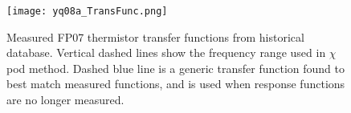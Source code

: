 \documentclass{ametsoc}
\begin{document}
\begin{figure}[t]
  \noindent\texttt{[image: yq08a\_TransFunc.png]}\\
  \caption{Measured FP07 thermistor transfer functions from historical database. Vertical dashed lines show the frequency range used in $\chi$pod method. Dashed blue line is a generic transfer function found to best match measured functions, and is used when response functions are no longer measured.}
  \label{xfr}
\end{figure}

\end{document}
